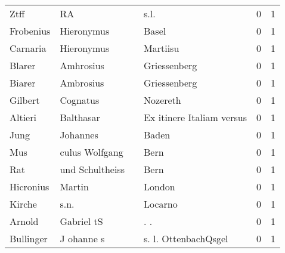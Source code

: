 \begin{tabular}{llllrr}
                     Ztff &                                 RA &             &                                        s.l. &          0 &         1 \\
                Frobenius &                         Hieronymus &             &                                       Basel &          0 &         1 \\
                 Carnaria &                         Hieronymus &             &                                    Martiisu &          0 &         1 \\
                   Blarer &                          Amhrosius &             &                                Griessenberg &          0 &         1 \\
                   Biarer &                          Ambrosius &             &                                Griessenberg &          0 &         1 \\
                  Gilbert &                           Cognatus &             &                                    Nozereth &          0 &         1 \\
                  Altieri &                          Balthasar &             &                   Ex itinere Italiam versus &          0 &         1 \\
                     Jung &                           Johannes &             &                                       Baden &          0 &         1 \\
                      Mus &                     culus Wolfgang &             &                                        Bern &          0 &         1 \\
                      Rat &                    und Schultheiss &             &                                        Bern &          0 &         1 \\
                Hicronius &                             Martin &             &                                      London &          0 &         1 \\
                   Kirche &                               s.n. &             &                                     Locarno &          0 &         1 \\
                   Arnold &                         Gabriel tS &             &                                        . .  &          0 &         1 \\
                Bullinger &                         J ohanne s &             &                        s. l. OttenbachQsgel &          0 &         1 \\

\end{tabular}
